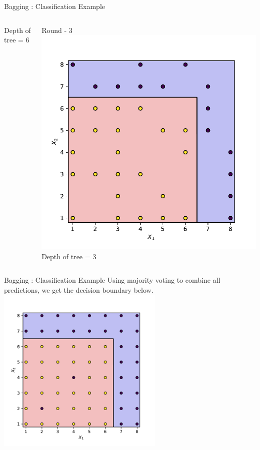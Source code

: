 \documentclass{beamer}
\begin{document}
\begin{frame}{Bagging : Classification Example}
\begin{columns}
\begin{column}{0.3\textwidth}
			Depth of tree = 6
		\end{column}
		\begin{column}{0.3\textwidth}
			\centering
			Round - 3\\
			\vspace{0.5cm}
			\includegraphics[width = \textwidth]{decision-boundary-2}
			Depth of tree = 3
		\end{column}
	\end{columns}

	\end{frame}

	\begin{frame}{Bagging : Classification Example}
	Using majority voting to combine all predictions, we get the decision boundary below.\\
	\vspace{0.5cm}
	\centering
	\includegraphics[width = 0.6\textwidth]{decision-boundary-ensemble}
	\end{frame}
	
\end{document}
